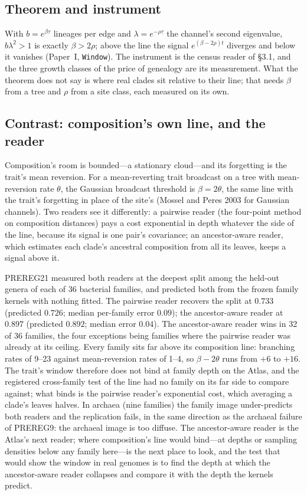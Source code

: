 \documentclass[11pt]{article}
\begin{document}
\subsection{Theorem and instrument}

With $b=e^{\beta\tau}$ lineages per edge and $\lambda=e^{-\rho\tau}$ the channel's second eigenvalue, $b\lambda^2>1$ is exactly $\beta>2\rho$; above the line the signal $e^{(\beta-2\rho)t}$ diverges and below it vanishes (Paper~I, \texttt{Window}). The instrument is the census reader of \S3.1, and the three growth classes of the price of genealogy are its measurement. What the theorem does not say is where real clades sit relative to their line; that needs $\beta$ from a tree and $\rho$ from a site class, each measured on its own.

\subsection{Contrast: composition's own line, and the reader}

Composition's room is bounded---a stationary cloud---and its forgetting is the trait's mean reversion. For a mean-reverting trait broadcast on a tree with mean-reversion rate $\theta$, the Gaussian broadcast threshold is $\beta=2\theta$, the same line with the trait's forgetting in place of the site's (Mossel and Peres 2003 for Gaussian channels). Two readers see it differently: a pairwise reader (the four-point method on composition distances) pays a cost exponential in depth whatever the side of the line, because its signal is one pair's covariance; an ancestor-aware reader, which estimates each clade's ancestral composition from all its leaves, keeps a signal above it.

PREREG21 measured both readers at the deepest split among the held-out genera of each of 36 bacterial families, and predicted both from the frozen family kernels with nothing fitted. The pairwise reader recovers the split at $0.733$ (predicted $0.726$; median per-family error $0.09$); the ancestor-aware reader at $0.897$ (predicted $0.892$; median error $0.04$). The ancestor-aware reader wins in 32 of 36 families, the four exceptions being families where the pairwise reader was already at its ceiling. Every family sits far above its composition line: branching rates of 9--23 against mean-reversion rates of 1--4, so $\beta-2\theta$ runs from $+6$ to $+16$. The trait's window therefore does not bind at family depth on the Atlas, and the registered cross-family test of the line had no family on its far side to compare against; what binds is the pairwise reader's exponential cost, which averaging a clade's leaves halves. In archaea (nine families) the family image under-predicts both readers and the replication fails, in the same direction as the archaeal failure of PREREG9: the archaeal image is too diffuse. The ancestor-aware reader is the Atlas's next reader; where composition's line would bind---at depths or sampling densities below any family here---is the next place to look, and the test that would show the window in real genomes is to find the depth at which the ancestor-aware reader collapses and compare it with the depth the kernels predict.
\end{document}
